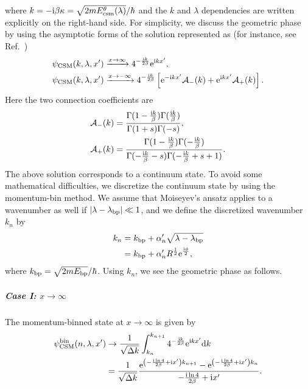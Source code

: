 where $k=-\mathrm{i} \beta\kappa=\sqrt{2mE^\theta_{\mathrm{csm}}(\lambda)}/\hbar$ and the $k$ and $\lambda$ dependencies are written explicitly on the right-hand side. For simplicity, we discuss the geometric phase by using the asymptotic forms of the solution represented as (for instance, see Ref.~\cite{MorikawaOgawa2025PTEP})
\begin{align}
    &\psi_{\mathrm{CSM}}(k,\lambda,x')\xrightarrow{x\to\infty}4^{-\frac{\mathrm{i} k}{2\beta}} \mathrm{e}^{\mathrm{i} kx'} ,
    \\  
    &\psi_{\mathrm{CSM}}(k,\lambda,x')\xrightarrow{x\to-\infty}
    4^{-\frac{\mathrm{i} k}{2\beta}}
    \left[\mathrm{e}^{-\mathrm{i} kx'}\mathcal A_-(k)+\mathrm{e}^{\mathrm{i} kx'}\mathcal A_+(k)\right].
    \label{src:2512_24528:eq:CSM-asy}
\end{align}
Here the two connection coefficients are
\begin{align}
    \mathcal A_-(k)
    &=\frac{\Gamma(1-\frac{\mathrm{i} k}{\beta})\Gamma(\frac{\mathrm{i} k}{\beta})}
    {\Gamma(1+s)\Gamma(-s)},
    \\
    \mathcal A_+(k)
    &=\frac{\Gamma(1-\frac{\mathrm{i} k}{\beta})\Gamma(-\frac{\mathrm{i} k}{\beta})}
    {\Gamma(-\frac{\mathrm{i} k}{\beta}-s)
     \Gamma(-\frac{\mathrm{i} k}{\beta}+s+1)}.
\end{align}
The above solution corresponds to a continuum state.
To avoid some mathematical difficulties, we discretize the continuum state by using the momentum-bin method. We assume that Moiseyev's ansatz applies to a wavenumber as well if $|\lambda-\lambda_{\mathrm{bp}}|\ll1$, and we define the discretized wavenumber $k_n$ by 
\begin{align}
    k_n &= k_{\mathrm{bp}}+\alpha'_n\sqrt{\lambda-\lambda_{\mathrm{bp}}}
    \label{src:2512_24528:eq:dis-kn1}
    \\
    &= k_{\mathrm{bp}}+\alpha'_nR^{\frac{1}{2}}\mathrm{e}^{\frac{\mathrm{i} \phi}{2}} ,
    \label{src:2512_24528:eq:dis-kn2}
\end{align}
where $k_{\mathrm{bp}}=\sqrt{2mE_{\mathrm{bp}}}/\hbar$. Using $k_n$, we see the geometric phase as follows.
\subparagraph{\textbf{Case I:} $x\to\infty$}
    The momentum-binned state at $x\to\infty$ is given by
    \begin{align}
        \psi^{\mathrm{bin}}_{\mathrm{CSM}}(n,\lambda,x') &\to \frac{1}{\sqrt{\Delta k}} \int_{k_n}^{k_{n+1}} 4^{-\frac{\mathrm{i} k}{2\beta}} \mathrm{e}^{\mathrm{i} kx'}\mathrm{d} k
        \notag\\
        &= \frac{1}{\sqrt{\Delta k}} \frac{\mathrm{e}^{\left(-\frac{\mathrm{i} \ln{4}}{2\beta}+\mathrm{i} x'\right)k_{n+1}}-\mathrm{e}^{\left(-\frac{\mathrm{i} \ln{4}}{2\beta}+\mathrm{i} x'\right)k_{n}}}{-\frac{\mathrm{i} \ln{4}}{2\beta}+\mathrm{i} x'} .
    \end{align} 
